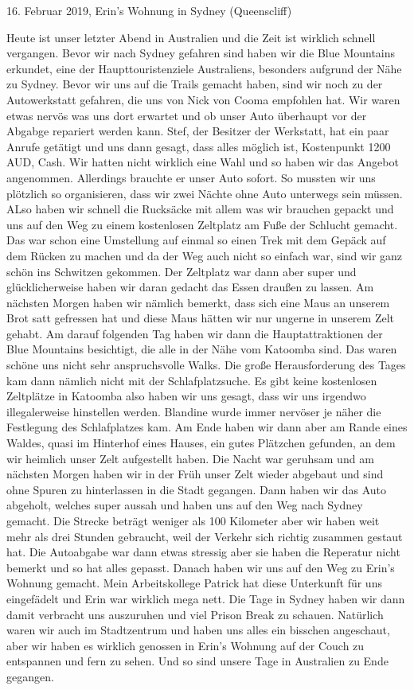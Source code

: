 \documentclass[11pt]{book}
\begin{document}
16. Februar 2019, Erin's Wohnung in Sydney (Queenscliff)

Heute ist unser letzter Abend in Australien und die Zeit ist wirklich schnell vergangen. Bevor wir nach Sydney gefahren sind 
haben wir die Blue Mountains erkundet, eine der Haupttouristenziele Australiens, besonders aufgrund der Nähe zu Sydney. Bevor 
wir uns auf die Trails gemacht haben, sind wir noch zu der Autowerkstatt gefahren, die uns von Nick von Cooma empfohlen hat. 
Wir waren etwas nervös was uns dort erwartet und ob unser Auto überhaupt vor der Abgabge repariert werden kann. Stef, der Besitzer 
der Werkstatt, hat ein paar Anrufe getätigt und uns dann gesagt, dass alles möglich ist, Kostenpunkt 1200 AUD, Cash. Wir hatten nicht 
wirklich eine Wahl und so haben wir das Angebot angenommen. Allerdings brauchte er unser Auto sofort. So mussten wir uns plötzlich 
so organisieren, dass wir zwei Nächte ohne Auto unterwegs sein müssen. ALso haben wir schnell die Rucksäcke mit allem was wir brauchen 
gepackt und uns auf den Weg zu einem kostenlosen Zeltplatz am Fuße der Schlucht gemacht. Das war schon eine Umstellung auf einmal so 
einen Trek mit dem Gepäck auf dem Rücken zu machen und da der Weg auch nicht so einfach war, sind wir ganz schön ins Schwitzen gekommen.
Der Zeltplatz war dann aber super und glücklicherweise haben wir daran gedacht das Essen draußen zu lassen. Am nächsten Morgen 
haben wir nämlich bemerkt, dass sich eine Maus an unserem Brot satt gefressen hat und diese Maus hätten wir nur ungerne in unserem 
Zelt gehabt. Am darauf folgenden Tag haben wir dann die Hauptattraktionen der Blue Mountains besichtigt, die alle in der Nähe vom 
Katoomba sind. Das waren schöne uns nicht sehr anspruchsvolle Walks. Die große Herausforderung des Tages kam dann nämlich nicht 
mit der Schlafplatzsuche. Es gibt keine kostenlosen Zeltplätze in Katoomba also haben wir uns gesagt, dass wir uns irgendwo illegalerweise 
hinstellen werden. Blandine wurde immer nervöser je näher die Festlegung des Schlafplatzes kam. Am Ende haben wir dann aber am Rande 
eines Waldes, quasi im Hinterhof eines Hauses, ein gutes Plätzchen gefunden, an dem wir heimlich unser Zelt aufgestellt haben. Die 
Nacht war geruhsam und am nächsten Morgen haben wir in der Früh unser Zelt wieder abgebaut und sind ohne Spuren zu hinterlassen in die 
Stadt gegangen. Dann haben wir das Auto abgeholt, welches super aussah und haben uns auf den Weg nach Sydney gemacht. Die Strecke 
beträgt weniger als 100 Kilometer aber wir haben weit mehr als drei Stunden gebraucht, weil der Verkehr sich richtig zusammen gestaut hat.
Die Autoabgabe war dann etwas stressig aber sie haben die Reperatur nicht bemerkt und so hat alles gepasst. Danach haben wir uns auf 
den Weg zu Erin's Wohnung gemacht. Mein Arbeitskollege Patrick hat diese Unterkunft für uns eingefädelt und Erin war wirklich 
mega nett. 
Die Tage in Sydney haben wir dann damit verbracht uns auszuruhen und viel Prison Break zu schauen. Natürlich waren wir auch im Stadtzentrum 
und haben uns alles ein bisschen angeschaut, aber wir haben es wirklich genossen in Erin's Wohnung auf der Couch zu entspannen und 
fern zu sehen. Und so sind unsere Tage in Australien zu Ende gegangen.
\end{document}

